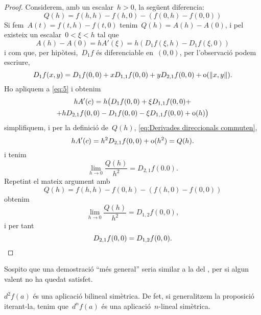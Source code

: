 \documentclass[../../main.tex]{subfiles}
\begin{document}
\begin{theorem}
\begin{proof}
            Considerem, amb un escalar~\(h>0\), la següent diferencia:
            \begin{equation}\label{eq:Derivades direccionals commuten}
            Q(h)=f(h,h)-f(h,0)-(f(0,h)-f(0,0))
            \end{equation}
            Si fem~\(A(t)=f(t,h)-f(t,0)\) tenim~\(Q(h)=A(h)-A(0)\), i pel  existeix un escalar~\(0<\xi<h\) tal que
            \begin{equation}\label{eq:5}
            A(h)-A(0)=hA'(\xi)=h(D_{1}f(\xi,h)-D_{1}f(\xi,0))
            \end{equation}
            i com que, per hipòtesi,~\(D_{1}f\) és diferenciable en~\((0,0)\), per l'observació  podem escriure,
            \[
                D_{1}f(x,y)=D_{1}f(0,0)+xD_{1,1}f(0,0)+yD_{2,1}f(0,0)+\omicron(\norm{x,y}).
            \]
            Ho apliquem a \eqref{eq:5} i obtenim
            \begin{multline*}
            hA'(c)=h\big(D_{1}f(0,0)+\xi D_{1,1}f(0,0)+\\+hD_{2,1}f(0,0)-D_{1}f(0,0)-\xi D_{1,1}f(0,0)+\operatorname{o}(h)\big)
            \end{multline*}
            simplifiquem, i per la definició de~\(Q(h)\), \eqref{eq:Derivades direccionals commuten},
            \[
                hA'(c)=h^{2}D_{2,1}f(0,0)+\operatorname{o}(h^{2})=Q(h).
            \]
            i tenim
            \[
                \lim_{h\to0}\frac{Q(h)}{h^{2}}=D_{2,1}f(0.0).
            \]
            Repetint el mateix argument amb
            \[
                Q(h)=f(h,h)-f(0,h)-(f(h,0)-f(0,0))
            \]
            obtenim
            \[
                \lim_{h\to0}\frac{Q(h)}{h^{2}}=D_{1,2}f(0,0),
            \]
            i per tant
            \[
                D_{2,1}f(0,0)=D_{1,2}f(0,0).\qedhere
            \]
        \end{proof}
        \begin{note}
            Sospito que una demostració ``més general'' seria similar a la del , per si algun valent no ha quedat satisfet.
        \end{note}
    \end{theorem}
    \begin{corollary}\label{obs:diferencial bilineal}
        \(d^{2}f(a)\) és una aplicació bilineal simètrica.
        De fet, si generalitzem la proposició iterant-la, tenim que~\(d^{n}f(a)\) és una aplicació~\(n\)-lineal simètrica.
    \end{corollary}
\end{document}
